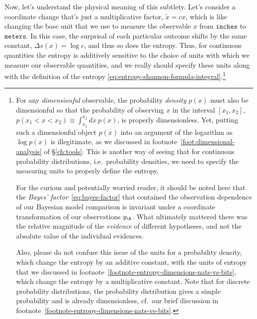 Now, let's understand the physical meaning of this subtlety. Let's consider a coordinate change that's just a multiplicative factor, $\widetilde{x}=c x$, which is like changing the base unit that we use to measure the observable $x$ from $\texttt{inches}$ to $\texttt{meters}$. In this case, the surprisal of each particular outcome shifts by the same constant, $\Delta s(x) = \log c$, and thus so does the entropy. Thus, for continuous quantities the entropy is additively sensitive to the choice of units with which we measure our observable quantities, and we really should specify these units along with the definition of the entropy \eqref{eq:entropy-shannon-formula-integral}.\footnote{For any \emph{dimensionful} observable, the probability \emph{density} $p(x)$ must also be dimensionful so that the probability of observing $x$ in the interval $[x_1,x_2]$,  $p(x_1 < x < x_2) \equiv \int_{x_1}^{x_2} dx\ p(x)$, is properly dimensionless. Yet, putting such a dimensionful object $p(x)$ into an argument of the logarithm as $\log p(x)$ is illegitimate, as we discussed in footnote~\ref{foot:dimensional-analysis} of \S\ref{ch:tools}. This is another way of seeing that for continuous probability distributions, i.e.~probability densities, we need to specify the measuring units to properly define the entropy. 

For the curious and potentially worried reader, it should be noted here that the \emph{Bayes' factor}~\eqref{eq:bayes-factor} that contained the observation dependence of our Bayesian model comparison is invariant under a coordinate transformation of our observations $y_{\A}$. What ultimately mattered there was the relative magnitude of the \emph{evidence} of different hypotheses, and not the absolute value of the individual evidences.

Also, please do not confuse this issue of the units for a probability density, which change the entropy by an additive constant, with the units of entropy that we discussed in footnote~\ref{footnote-entropy-dimensions-nats-vs-bits}, which change the entropy by a multiplicative constant. Note that for discrete probability distributions, the probability distribution gives a simple probability and is already dimensionless, cf.~our brief discussion in footnote~\ref{footnote-entropy-dimensions-nats-vs-bits}.
}


